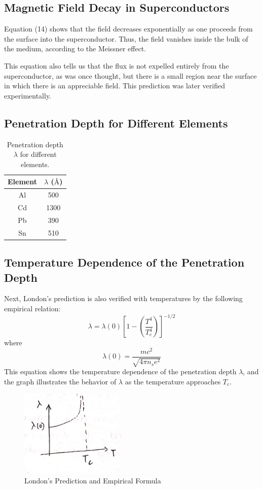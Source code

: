 \documentclass{article}
\begin{document}
\subsection{Magnetic Field Decay in Superconductors}

Equation (14) shows that the field decreases exponentially as one proceeds from the surface into the superconductor. Thus, the field vanishes inside the bulk of the medium, according to the Meissner effect.

This equation also tells us that the flux is not expelled entirely from the superconductor, as was once thought, but there is a small region near the surface in which there is an appreciable field. This prediction was later verified experimentally.

\subsection{Penetration Depth for Different Elements}

\begin{table}[h!]
\centering
\begin{tabular}{|c|c|}
\hline
\textbf{Element} & \(\lambda\) (\(\text{\AA}\)) \\ \hline
Al & 500 \\ \hline
Cd & 1300 \\ \hline
Pb & 390 \\ \hline
Sn & 510 \\ \hline
\end{tabular}
\caption{Penetration depth \(\lambda\) for different elements.}
\end{table}

\subsection{Temperature Dependence of the Penetration Depth}

Next, London's prediction is also verified with temperatures by the following empirical relation:
\[
\lambda = \lambda(0) \left[ 1 - \left( \frac{T^4}{T_c^4} \right) \right]^{-1/2}
\]
where
\[
\lambda(0) = \frac{mc^2}{\sqrt{4 \pi n_s e^2}}
\]
This equation shows the temperature dependence of the penetration depth \(\lambda\), and the graph illustrates the behavior of \(\lambda\) as the temperature approaches \(T_c\).

\begin{figure}
    \begin{center}
        \includegraphics[width=0.45\textwidth]{figures/6.png}
    \end{center}
    \caption{London's Prediction and Empirical Formula}\label{fig:}
\end{figure}
\end{document}
